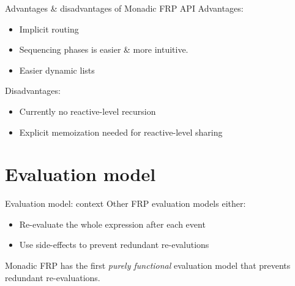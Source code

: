 \documentclass{beamer}
\begin{document}
\begin{frame}{Advantages \& disadvantages of Monadic FRP API}
Advantages: 
\begin{itemize}
\item Implicit routing
\item Sequencing phases is easier \& more intuitive.
\item Easier dynamic lists 
\end{itemize}
Disadvantages:
\begin{itemize}
\item Currently no reactive-level recursion
\item Explicit memoization needed for reactive-level sharing
\end{itemize}
\end{frame}

\section{Evaluation model}
\begin{frame}{Evaluation model: context}
Other FRP evaluation models either:
\begin{itemize}
\item Re-evaluate the whole expression after each event
\item Use side-effects to prevent redundant re-evalutions
\end{itemize}

Monadic FRP has the first \emph{purely functional} evaluation model that prevents redundant re-evaluations.

\end{frame}
\end{document}
